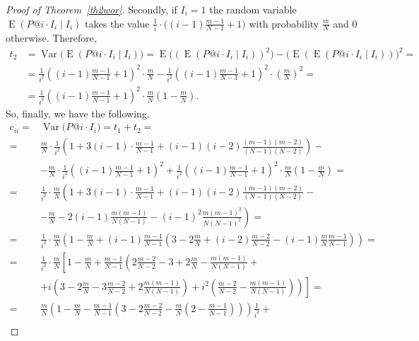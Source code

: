 \documentclass[10pt,a4paper]{amsart}
\begin{document}
\begin{proof}[Proof of Theorem~\ref {th2wor}]
Secondly, if $I_i=1$ the random variable $\operatorname{E}(P@i\cdot I_i \mid I_i)$ takes the value $\frac{1}{i}\cdot \big((i-1)\frac{m-1}{N-1}+1\big)$ with probability $\frac{m}{N}$ and $0$ otherwise. Therefore, 
\begin{equation*}
\begin{split} t_2&=\operatorname{Var}\big(\operatorname{E}(P@i\cdot I_i \mid I_i)\big)=\operatorname{E}\big((\operatorname{E}(P@i\cdot I_i \mid I_i))^2\big)-\big(\operatorname{E}(\operatorname{E}(P@i\cdot I_i \mid I_i))\big)^2=\\
&=\frac{1}{i^2}\left((i-1)\frac{m-1}{N-1}+1\right)^2\cdot \frac{m}{N}-\frac{1}{i^2}\left((i-1)\frac{m-1}{N-1}+1\right)^2\cdot \left(\frac{m}{N}\right)^2=\\
&=\frac{1}{i^2}\left((i-1)\frac{m-1}{N-1}+1\right)^2\cdot \frac{m}{N}\left(1-\frac{m}{N}\right).
\end{split}
\end{equation*}
So, finally, we have the following.
\begin{equation*}
\begin{split}
c_{ii}=&\operatorname{Var}\big(P@i\cdot I_i\big)=t_1+t_2=\\
= &\frac{m}{N} \cdot \frac{1}{i^2} \left(1+3(i-1)\cdot \frac{m-1}{N-1}+
(i-1)(i-2)\frac{(m-1)(m-2)}{(N-1)(N-2)}\right)-\\
&-\frac{m}{N} \cdot \frac{1}{i^2} \left((i-1)\frac{m-1}{N-1}+1\right)^2 +
\frac{1}{i^2}\left((i-1)\frac{m-1}{N-1}+1\right)^2\cdot \frac{m}{N}\left(1-\frac{m}{N}\right)=
\\
= &\frac{1}{i^2}\cdot \frac{m}{N} \left(1+3(i-1)\cdot \frac{m-1}{N-1}+
(i-1)(i-2)\frac{(m-1)(m-2)}{(N-1)(N-2)}-\right.\\
& -\left.\frac{m}{N}-2(i-1)\frac{m(m-1)}{N(N-1)} - 
 (i-1)^2\frac{m(m-1)^2}{N(N-1)^2} \right)=\\
= &\frac{1}{i^2}\cdot \frac{m}{N} \left(1- \frac{m}{N}+(i-1)\frac{m-1}{N-1}\left(3-2\frac{m}{N}+(i-2)\frac{m-2}{N-2}-(i-1)\frac{m}{N} \frac{m-1}{N-1}\right) \right)=\\
=& \frac{1}{i^2} \cdot \frac{m}{N} \left[1- \frac{m}{N}+\frac{m-1}{N-1} \left(2\frac{m-2}{N-2}-3+2\frac{m}{N}-\frac{m(m-1)}{N(N-1)}+ \right. \right.\\
&\left. \left. + i\left(3-2\frac{m}{N}-3\frac{m-2}{N-2}+2\frac{m(m-1)}{N(N-1)}\right) + i^2\left(\frac{m-2}{N-2}-\frac{m(m-1)}{N(N-1)}\right) \right) \right]=\\
= & \frac{m}{N} \left(1- \frac{m}{N}-\frac{m-1}{N-1} \left(3-2\frac{m-2}{N-2}-\frac{m}{N}\left(2-\frac{m-1}{N-1}\right)\right)\right)\frac{1}{i^2}+\\

\end{split}
\end{equation*}
\end{proof}
\end{document}
